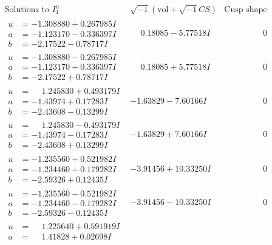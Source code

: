 \documentclass[1p]{elsarticle_modified}
\theoremstyle{definition}
\newcommand{\I}{\sqrt{-1}}
\begin{document}
$$\begin{array}{c|c|c}
\text{Solutions to }I^u_{1}& \I (\text{vol} + \sqrt{-1}CS) & \text{Cusp shape}\\
 \hline 
\begin{aligned}
u &= -1.308880 + 0.267985 I \\
a &= -1.123170 - 0.336397 I \\
b &= -2.17522 - 0.78717 I\end{aligned}
 & \phantom{-}0.18085 - 5.77518 I & \phantom{-0.000000 } 0 \\ \hline\begin{aligned}
u &= -1.308880 - 0.267985 I \\
a &= -1.123170 + 0.336397 I \\
b &= -2.17522 + 0.78717 I\end{aligned}
 & \phantom{-}0.18085 + 5.77518 I & \phantom{-0.000000 } 0 \\ \hline\begin{aligned}
u &= \phantom{-}1.245830 + 0.493179 I \\
a &= -1.43974 + 0.17283 I \\
b &= -2.43608 - 0.13299 I\end{aligned}
 & -1.63829 - 7.60166 I & \phantom{-0.000000 } 0 \\ \hline\begin{aligned}
u &= \phantom{-}1.245830 - 0.493179 I \\
a &= -1.43974 - 0.17283 I \\
b &= -2.43608 + 0.13299 I\end{aligned}
 & -1.63829 + 7.60166 I & \phantom{-0.000000 } 0 \\ \hline\begin{aligned}
u &= -1.235560 + 0.521982 I \\
a &= -1.234460 + 0.179282 I \\
b &= -2.59326 + 0.12435 I\end{aligned}
 & -3.91456 + 10.33250 I & \phantom{-0.000000 } 0 \\ \hline\begin{aligned}
u &= -1.235560 - 0.521982 I \\
a &= -1.234460 - 0.179282 I \\
b &= -2.59326 - 0.12435 I\end{aligned}
 & -3.91456 - 10.33250 I & \phantom{-0.000000 } 0 \\ \hline\begin{aligned}
u &= \phantom{-}1.225640 + 0.591919 I \\
a &= \phantom{-}1.41828 + 0.02698 I \\

\end{aligned}
\end{array}$$
\end{document}
